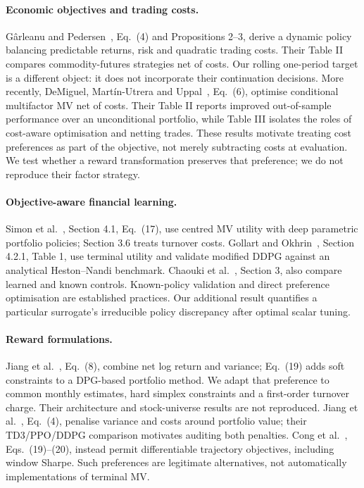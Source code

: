 \documentclass[sigconf,anonymous,review]{acmart}
\begin{document}
\paragraph{Economic objectives and trading costs.}
G\^arleanu and Pedersen~\cite{garleanu2013}, Eq.\ (4) and Propositions 2--3, derive a dynamic policy balancing predictable returns, risk and quadratic trading costs. Their Table II compares commodity-futures strategies net of costs. Our rolling one-period target is a different object: it does not incorporate their continuation decisions. More recently, DeMiguel, Mart\'in-Utrera and Uppal~\cite{demiguel2024}, Eq.\ (6), optimise conditional multifactor MV net of costs. Their Table II reports improved out-of-sample performance over an unconditional portfolio, while Table III isolates the roles of cost-aware optimisation and netting trades. These results motivate treating cost preferences as part of the objective, not merely subtracting costs at evaluation. We test whether a reward transformation preserves that preference; we do not reproduce their factor strategy.

\paragraph{Objective-aware financial learning.}
Simon et al.~\cite{simon2026}, Section 4.1, Eq.\ (17), use centred MV utility with deep parametric portfolio policies; Section 3.6 treats turnover costs. Gollart and Okhrin~\cite{gollart2025}, Section 4.2.1, Table 1, use terminal utility and validate modified DDPG against an analytical Heston--Nandi benchmark. Chaouki et al.~\cite{chaouki2020}, Section 3, also compare learned and known controls. Known-policy validation and direct preference optimisation are established practices. Our additional result quantifies a particular surrogate's irreducible policy discrepancy after optimal scalar tuning.

\paragraph{Reward formulations.}
Jiang et al.~\cite{jiang2025}, Eq.\ (8), combine net log return and variance; Eq.\ (19) adds soft constraints to a DPG-based portfolio method. We adapt that preference to common monthly estimates, hard simplex constraints and a first-order turnover charge. Their architecture and stock-universe results are not reproduced. Jiang et al.~\cite{jiang2024}, Eq.\ (4), penalise variance and costs around portfolio value; their TD3/PPO/DDPG comparison motivates auditing both penalties. Cong et al.~\cite{cong2026}, Eqs.\ (19)--(20), instead permit differentiable trajectory objectives, including window Sharpe. Such preferences are legitimate alternatives, not automatically implementations of terminal MV.
\end{document}
